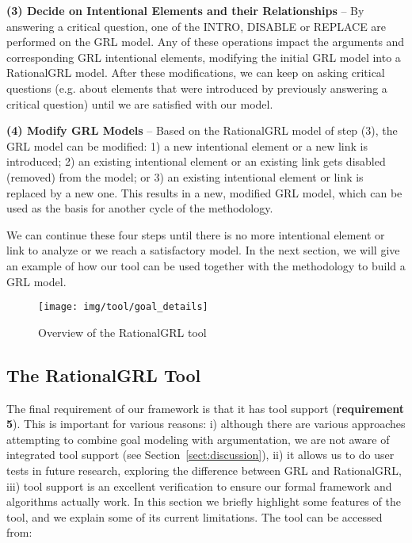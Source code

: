 \textbf{(3) Decide on Intentional Elements and their Relationships} -- By answering a critical question, one of the \textsf{INTRO}, \textsf{DISABLE} or \textsf{REPLACE} are performed on the GRL model. Any of these operations impact the arguments and corresponding GRL intentional elements, modifying the initial GRL model into a RationalGRL model. After these modifications, we can keep on asking critical questions (e.g. about elements that were introduced by previously answering a critical question) until we are satisfied with our model.   

\textbf{(4) Modify GRL Models} -- Based on the RationalGRL model of step (3), the GRL model can be modified: 1) a new intentional element or a new link is introduced; 2) an existing intentional element or an existing link gets disabled (removed) from the model; or 3) an existing intentional element or link is replaced by a new one. This results in a new, modified GRL model, which can be used as the basis for another cycle of the methodology. 

We can continue these four steps until there is no more intentional element or link to analyze or we reach a satisfactory model. In the next section, we will give an example of how our tool can be used together with the methodology to build a GRL model.  

\begin{figure*}[t]
\centering
\texttt{[image: img/tool/goal\_details]}
\caption{Overview of the RationalGRL tool}
\label{fig:tool:overview}
\end{figure*}


\subsection{The RationalGRL Tool}
\label{sect:tool}

The final requirement of our framework is that it has tool support (\textbf{requirement 5}). This is important for various reasons: i) although there are various approaches attempting to combine goal modeling with argumentation, we are not aware of integrated tool support (see Section~\ref{sect:discussion}), ii) it allows us to do user tests in future research, exploring the difference between GRL and RationalGRL, iii) tool support is an excellent verification to ensure our formal framework and algorithms actually work. In this section we briefly highlight some features of the tool, and we explain some of its current limitations. The tool can be accessed from:

